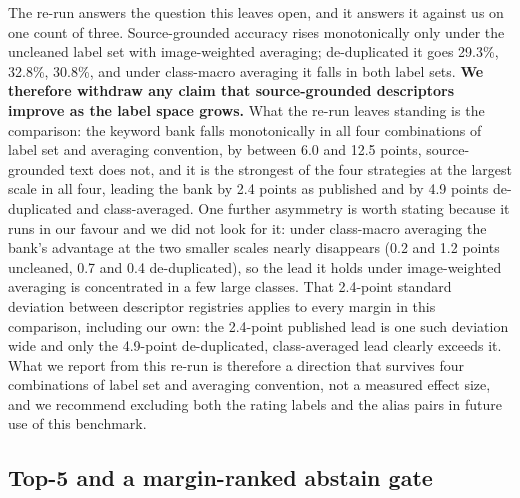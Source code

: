 \documentclass[a4paper,fleqn]{cas-dc}
\begin{document}
The re-run answers the question this leaves open, and it answers it against us on one count of
three. Source-grounded accuracy rises monotonically only under the uncleaned label set with
image-weighted averaging; de-duplicated it goes 29.3\%, 32.8\%, 30.8\%, and under class-macro
averaging it falls in both label sets. \textbf{We therefore withdraw any claim that source-grounded
descriptors improve as the label space grows.} What the re-run leaves standing is the comparison:
the keyword bank falls monotonically in all four combinations of label set and averaging
convention, by between 6.0 and 12.5 points, source-grounded text does not, and it is the strongest
of the four strategies at the largest scale in all four, leading the bank by 2.4 points as
published and by 4.9 points de-duplicated and class-averaged. One further asymmetry is worth
stating because it runs in our favour and we did not look for it: under class-macro averaging the
bank's advantage at the two smaller scales nearly disappears (0.2 and 1.2 points uncleaned, 0.7 and
0.4 de-duplicated), so the lead it holds under image-weighted averaging is concentrated in a few
large classes.
That 2.4-point standard deviation between descriptor registries applies to every
margin in this comparison, including our own: the 2.4-point published lead is one such deviation
wide and only the 4.9-point de-duplicated, class-averaged lead clearly exceeds it. What we report
from this re-run is therefore a direction that survives four combinations of label set and
averaging convention, not a measured effect size, and we recommend excluding both the rating labels
and the alias pairs in future use of this benchmark.

\subsection{Top-5 and a margin-ranked abstain gate}
\label{sec:abstain}

\end{document}
